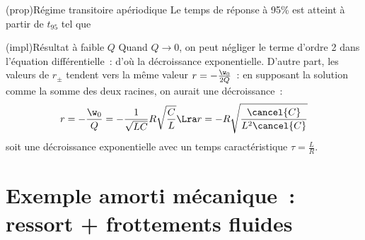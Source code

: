 \documentclass[../../main/main.tex]{subfiles}
\begin{document}
\begin{tcb*}[label=prop:transiaper](prop){Régime transitoire apériodique}
	Le temps de réponse à 95\% est atteint à partir de $t_{95}$ tel que
\end{tcb*}

\begin{tcb}[label=impl:aperpetitQ](impl){Résultat à faible $Q$}
	Quand $Q \longrightarrow 0$, on peut négliger le terme d'ordre 2 dans
	l'équation différentielle~:
	d'où la décroissance exponentielle. D'autre part, les valeurs de $r_\pm$
	tendent vers la même valeur $r = - \frac{\w_0}{2Q}$~: en supposant la solution
	comme la somme des deux racines, on aurait une décroissance~:
	\begin{gather*}
		r = -\frac{\w_0}{Q} = - \frac{1}{\sqrt{LC}}R
		\sqrt{\frac{C}{L}}
		\Lra
		r = -R \sqrt{\frac{\cancel{C}}{L^2\cancel{C}}}
	\end{gather*}
	soit une décroissance exponentielle avec un temps
	caractéristique $\tau = \frac{L}{R}$.
\end{tcb}

\vspace{-15pt}
\section{Exemple amorti mécanique~: ressort + frottements fluides}
\end{document}

